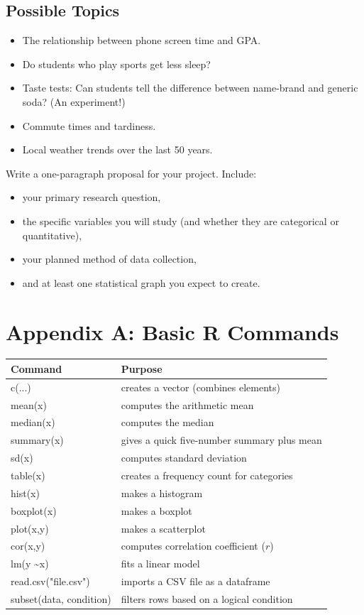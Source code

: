 \documentclass[11pt,openany]{book}
\begin{document}
\section{Possible Topics}
\begin{itemize}
    \item The relationship between phone screen time and GPA.
    \item Do students who play sports get less sleep?
    \item Taste tests: Can students tell the difference between name-brand and generic soda? (An experiment!)
    \item Commute times and tardiness.
    \item Local weather trends over the last 50 years.
\end{itemize}

\begin{practicebox}
Write a one-paragraph proposal for your project. Include:
\begin{itemize}
    \item your primary research question,
    \item the specific variables you will study (and whether they are categorical or quantitative),
    \item your planned method of data collection,
    \item and at least one statistical graph you expect to create.
\end{itemize}
\end{practicebox}

\backmatter

\chapter*{Appendix A: Basic R Commands}
\begin{longtable}{>{\ttfamily}p{} p{}}
\toprule
Command & Purpose \\
\midrule
\endhead
c(...) & creates a vector (combines elements) \\
mean(x) & computes the arithmetic mean \\
median(x) & computes the median \\
summary(x) & gives a quick five-number summary plus mean \\
sd(x) & computes standard deviation \\
table(x) & creates a frequency count for categories \\
hist(x) & makes a histogram \\
boxplot(x) & makes a boxplot \\
plot(x,y) & makes a scatterplot \\
cor(x,y) & computes correlation coefficient ($r$) \\
lm(y \textasciitilde x) & fits a linear model \\
read.csv("file.csv") & imports a CSV file as a dataframe \\
subset(data, condition) & filters rows based on a logical condition \\
\bottomrule
\end{longtable}
\end{document}
